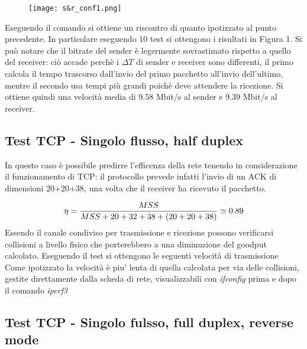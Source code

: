 \documentclass[../lab2.tex]{subfiles}
\begin{document}
    \begin{wrapfigure}{r}{0.5\textwidth}
        \vspace{-15pt}
        \centering
        \texttt{[image: s\&r\_conf1.png]}
        \caption{}
        \vspace{-25pt}
    \end{wrapfigure}

           Eseguendo il comando si ottiene un riscontro di quanto ipotizzato al punto 
           precedente. In particolare eseguendo 10 test si ottengono i risultati in Figura 1.
           Si può notare che il bitrate del sender è legermente sovrastimato rispetto a quello del 
           receiver: ciò accade perchè i $\Delta T$ di sender e receiver sono differenti, il primo
           calcola il tempo trascorso dall'invio del primo pacchetto all'invio dell'ultimo, mentre il 
           secondo usa tempi più grandi poichè deve attendere la ricezione. 
           Si ottiene quindi una velocità media di 9.58 Mbit/s al sender e 9.39 Mbit/s al receiver.
\vspace{-10pt}
\subsection{Test TCP - Singolo flusso, half duplex}

            In questo caso è possibile predirre l'efficenza della rete tenendo in considerazione il funzionamento di TCP: il protocollo 
            prevede infatti l'invio di un ACK di dimensioni 20+20+38, una volta che il receiver ha ricevuto il pacchetto. 

            \begin{equation}
                \centering
                \eta = \frac{MSS}{MSS+20+32+38+(20 + 20 + 38)}\simeq 0.89
            \end{equation}
            Essendo il canale condiviso per trasmissione e ricezione possono verificarsi collisioni a livello fisico che porterebbero a
            una diminuzione del goodput calcolato. Eseguendo il test si ottengono le seguenti velocità di trasmissione\\
   
               
        
            Come ipotizzato la velocità è piu' lenta di quella calcolata per via delle collisioni, gestite direttamente 
            dalla scheda di rete, visualizzabili con \textit{ifconfig} prima e dopo il comando \textit{iperf3}

\subsection{Test TCP - Singolo fulsso, full duplex, reverse mode}
\end{document}
